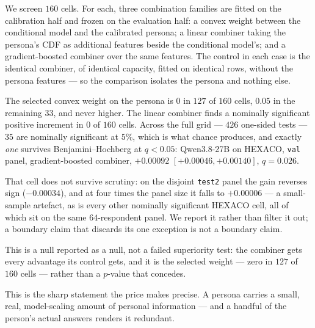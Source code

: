 We screen $160$ cells. For each, three combination families are fitted on the
calibration half and frozen on the evaluation half: a convex weight between the
conditional model and the calibrated persona; a linear combiner taking the
persona's CDF as additional features beside the conditional model's; and a
gradient-boosted combiner over the same features. The control in each case is the
identical combiner, of identical capacity, fitted on identical rows, without the
persona features --- so the comparison isolates the persona and nothing else.

\begin{table}[t]\centering\footnotesize

\caption{Incremental value of a persona given the respondent's own observed
answers. $\bar w^{*}$ is the mean selected convex weight on the persona.
Significant cells are \emph{uncorrected} counts, shown to make the multiplicity
visible: across all $426$ one-sided tests, one survives Benjamini--Hochberg at
$q<0.05$, and it reverses sign on its own disjoint panel.}
\label{tab:incremental}
\end{table}

The selected convex weight on the persona is $0$ in $127$ of $160$ cells, $0.05$
in the remaining $33$, and never higher. The linear combiner finds a nominally
significant positive increment in $0$ of $160$ cells. Across the full grid ---
$426$ one-sided tests --- $35$ are nominally significant at $5\%$, which is what
chance produces, and exactly \emph{one} survives Benjamini--Hochberg at $q<0.05$:
Qwen3.8-27B on HEXACO, \texttt{val} panel, gradient-boosted combiner,
$+0.00092$ $[+0.00046,+0.00140]$, $q{=}0.026$.

That cell does not survive scrutiny: on the disjoint \texttt{test2} panel the gain
reverses sign ($-0.00034$), and at four times the panel size it falls to
$+0.00006$ --- a small-sample artefact, as is every other nominally significant
HEXACO cell, all of which sit on the same $64$-respondent panel. We report it
rather than filter it out; a boundary claim that discards its one exception is
not a boundary claim.

This is a null reported as a null, not a failed superiority test: the combiner
gets every advantage its control gets, and it is the selected weight --- zero in
$127$ of $160$ cells --- rather than a $p$-value that concedes.

This is the sharp statement the price makes precise. A persona carries a small,
real, model-scaling amount of personal information --- and a handful of the
person's actual answers renders it redundant.
